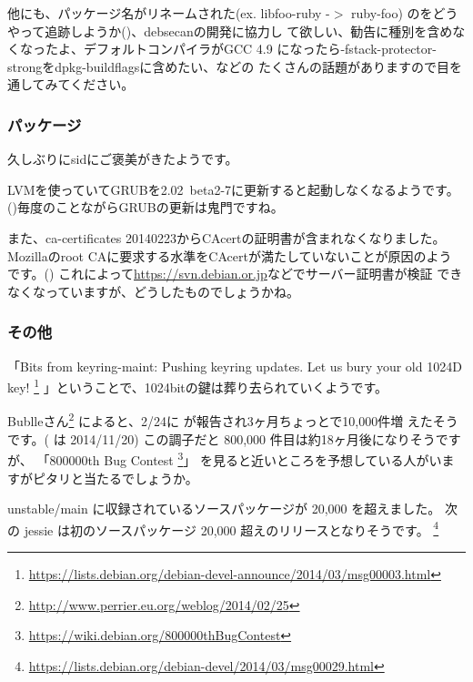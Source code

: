 \documentclass[mingoth,a4paper]{jsarticle}
\begin{document}
他にも、パッケージ名がリネームされた(ex. libfoo-ruby -$>$ ruby-foo)
のをどうやって追跡しようか()、debsecanの開発に協力し
て欲しい、勧告に種別を含めなくなったよ、デフォルトコンパイラがGCC 4.9
になったら-fstack-protector-strongをdpkg-buildflagsに含めたい、などの
たくさんの話題がありますので目を通してみてください。

\subsubsection{パッケージ}

久しぶりにsidにご褒美がきたようです。

LVMを使っていてGRUBを2.02~beta2-7に更新すると起動しなくなるようです。
()毎度のことながらGRUBの更新は鬼門ですね。
\newline

また、ca-certificates 20140223からCAcertの証明書が含まれなくなりました。
Mozillaのroot CAに要求する水準をCAcertが満たしていないことが原因のよう
です。()
これによって\url{https://svn.debian.or.jp}などでサーバー証明書が検証
できなくなっていますが、どうしたものでしょうかね。

\subsubsection{その他}

「Bits from keyring-maint: Pushing keyring updates. Let us bury your old 1024D key!
\footnote{\url{https://lists.debian.org/debian-devel-announce/2014/03/msg00003.html}}
」ということで、1024bitの鍵は葬り去られていくようです。
\newline

Bublleさん\footnote{\url{http://www.perrier.eu.org/weblog/2014/02/25}}
によると、2/24に  が報告され3ヶ月ちょっとで10,000件増
えたそうです。( は 2014/11/20)
この調子だと 800,000 件目は約18ヶ月後になりそうですが、
「800000th Bug Contest \footnote{\url{https://wiki.debian.org/800000thBugContest}}」
を見ると近いところを予想している人がいますがピタリと当たるでしょうか。
\newline

unstable/main に収録されているソースパッケージが 20,000 を超えました。
次の jessie は初のソースパッケージ 20,000 超えのリリースとなりそうです。
\footnote{\url{https://lists.debian.org/debian-devel/2014/03/msg00029.html}}

\end{document}

